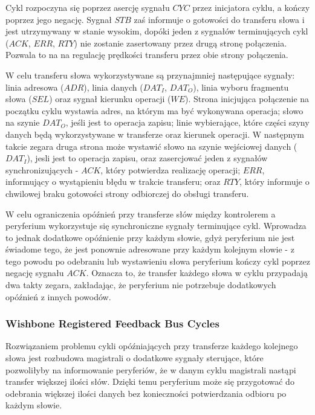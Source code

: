 Cykl rozpoczyna się poprzez asercję sygnału $CYC$ przez inicjatora cyklu, a kończy poprzez jego negację. Sygnał $STB$ zaś informuje o gotowości do transferu słowa i jest utrzymywany w stanie wysokim, dopóki jeden z sygnałów terminujących cykl ($ACK$, $ERR$, $RTY$) nie zostanie zasertowany przez drugą stronę połączenia. Pozwala to na na regulację prędkości transferu przez obie strony połączenia.


W celu transferu słowa wykorzystywane są przynajmniej następujące sygnały: linia adresowa ($ADR$), linia danych ($DAT_I$, $DAT_O$), linia wyboru fragmentu słowa ($SEL$) oraz sygnał kierunku operacji ($WE$). Strona inicjująca połączenie na początku cyklu wystawia adres, na którym ma być wykonywana operacja; słowo na szynie $DAT_O$, jeśli jest to operacja zapisu; linie wybierające, które części szyny danych będą wykorzystywane w transferze oraz kierunek operacji. W następnym takcie zegara druga strona może wystawić słowo na szynie wejściowej danych ($DAT_I$), jesli jest to operacja zapisu, oraz zasercjować jeden z sygnałów synchronizujących - $ACK$, który potwierdza realizację operacji; $ERR$, informujący o wystąpieniu błędu w trakcie transferu; oraz $RTY$, który informuje o chwilowej braku gotowości strony odbiorczej do obsługi transferu.


W celu ograniczenia opóźnień przy transferze słów między kontrolerem a peryferium wykorzystuje się synchroniczne sygnały terminujące cykl. Wprowadza to jednak dodatkowe opóźnienie przy każdym słowie, gdyż peryferium nie jest świadome tego, że jest ponownie adresowane przy każdym kolejnym słowie - z tego powodu po odebraniu lub wystawieniu słowa peryferium kończy cykl poprzez negację sygnału $ACK$. Oznacza to, że transfer każdego słowa w cyklu przypadają dwa takty zegara, zakładając, że peryferium nie potrzebuje dodatkowych opóźnień z innych powodów.

\subsubsection{Wishbone Registered Feedback Bus Cycles}

Rozwiązaniem problemu cykli opóźniających przy transferze każdego kolejnego słowa jest rozbudowa magistrali o dodatkowe sygnały sterujące, które pozwoliłyby na informowanie peryferiów, że w danym cyklu magistrali nastąpi transfer większej ilości słów. Dzięki temu peryferium może się przygotować do odebrania większej ilości danych bez konieczności potwierdzania odbioru po każdym słowie.

